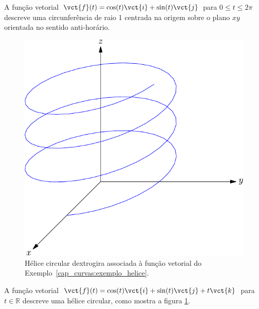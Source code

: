 \begin{ex}
A função vetorial $\vct{f}(t)=\cos(t)\vct{i}+\sin(t)\vct{j}$ para $0\leq t \leq 2\pi$ descreve  uma circunferência de raio 1 centrada na origem sobre o plano $xy$ orientada no sentido anti-horário.
\end{ex}

\begin{figure}%
\begin{center}
    \includegraphics{./cap_curvas/figs/helice}
\caption{\label{helicedex}Hélice circular dextrogira associada à função vetorial do Exemplo~\ref{cap_curvas:exemplo_helice}.}
  \end{center}
\end{figure}

\begin{ex}\label{cap_curvas:exemplo_helice}
A função vetorial $\vct{f}(t)=\cos(t)\vct{i}+\sin(t)\vct{j}+t\vct{k}$ para $ t \in\mathbb{R}$ descreve uma hélice circular, como mostra a figura \ref{helicedex}.
\end{ex}

